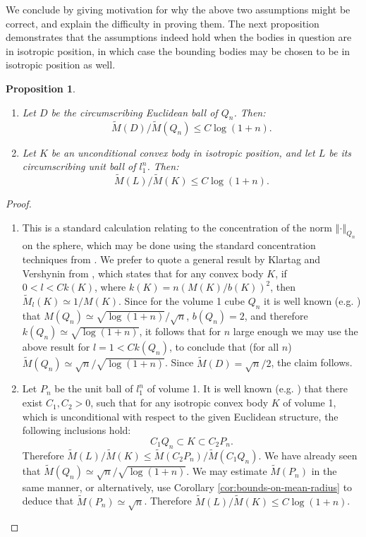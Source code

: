 \documentclass[12pt,oneside]{amsart}
\newtheorem{prop}[thm]{Proposition}
\theoremstyle{definition}
\theoremstyle{remark}
\theoremstyle{proof}
\numberwithin{equation}{section}
\newcommand{\norm}[1]{\left\Vert#1\right\Vert}
\renewcommand{\MR}{\widetilde{M}} %
\begin{document}
We conclude by giving motivation for why the above two
assumptions might be correct, and explain the difficulty in
proving them. The next proposition demonstrates that the
assumptions indeed hold when the bodies in question are in
isotropic position, in which case the bounding bodies may be
chosen to be in isotropic position as well.

\begin{prop} \label{prop:assumptions-work-for-isotropic}
\hfill
\begin{enumerate}
\item
Let $D$ be the circumscribing Euclidean ball of $Q_n$. Then:
\[\MR(D) / \MR(Q_n) \leq C \log(1+n).\]
\item
Let $K$ be an unconditional convex body in isotropic position,
and let $L$ be its circumscribing unit ball of $l_1^n$. Then:
\[\MR(L) / \MR(K) \leq C \log(1+n).\]
\end{enumerate}
\end{prop}

\begin{proof}
\hfill
\begin{enumerate}
\item
This is a standard calculation relating to the concentration of
the norm $\norm{\cdot}_{Q_n}$ on the sphere, which may be done
using the standard concentration techniques from
\cite{Milman-Schechtman-Book}.
We prefer to quote a general result by Klartag and Vershynin from
\cite[Proposition 1.2]{Klartag-Vershynin}, which states that for
any convex body $K$, if $0<l<C k(K)$, where $k(K) =
n(M(K)/b(K))^2$, then $\MR_l(K) \simeq 1/M(K)$. Since for the
volume 1 cube $Q_n$ it is well known (e.g.
\cite{Milman-Schechtman-Book}) that $M(Q_n) \simeq
\sqrt{\log(1+n)} / \sqrt{n}$, $b(Q_n) = 2$, and therefore $k(Q_n)
\simeq \sqrt{\log(1+n)}$, it follows that for $n$ large enough we
may use the above result for $l=1 < C k(Q_n)$, to conclude that
(for all $n$) $\MR(Q_n) \simeq \sqrt{n} / \sqrt{\log(1+n)}$. Since
$\MR(D) = \sqrt{n} / 2$, the claim follows.

\item
Let $P_n$ be the unit ball of $l_1^n$ of volume 1. It is well
known (e.g. \cite{Bobkov-Nazarov}) that there exist $C_1,C_2
> 0$, such that for any isotropic convex body $K$ of volume 1,
which is unconditional with respect to the given Euclidean
structure, the following inclusions hold:
\[
C_1 Q_n \subset K \subset C_2 P_n. \] Therefore $\MR(L) / \MR(K)
\leq \MR(C_2 P_n) / \MR( C_1 Q_n)$. We have already seen that
$\MR(Q_n) \simeq \sqrt{n} / \sqrt{\log(1+n)}$. We may estimate
$\MR(P_n)$ in the same manner, or alternatively, use Corollary
\ref{cor:bounds-on-mean-radius} to deduce that $\MR(P_n) \simeq
\sqrt{n}$. Therefore $\MR(L) / \MR(K) \leq C \log(1+n)$.
\end{enumerate}
\end{proof}
\end{document}
